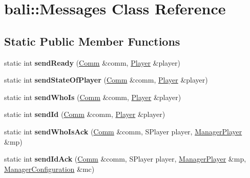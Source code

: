 \hypertarget{classbali_1_1_messages}{\section{bali\-:\-:Messages Class Reference}
\label{classbali_1_1_messages}
}
\subsection*{Static Public Member Functions}
\begin{DoxyCompactItemize}
\item 
\hypertarget{classbali_1_1_messages_aca0ea01768bce05de3d875fddcde5900}{static int {\bfseries send\-Ready} (\hyperlink{classbali_1_1_comm}{Comm} \&comm, \hyperlink{classbali_1_1_player}{Player} \&player)}\label{classbali_1_1_messages_aca0ea01768bce05de3d875fddcde5900}

\item 
\hypertarget{classbali_1_1_messages_aa33581609f3bdd2b99a90095cb76bcd0}{static int {\bfseries send\-State\-Of\-Player} (\hyperlink{classbali_1_1_comm}{Comm} \&comm, \hyperlink{classbali_1_1_player}{Player} \&player)}\label{classbali_1_1_messages_aa33581609f3bdd2b99a90095cb76bcd0}

\item 
\hypertarget{classbali_1_1_messages_a8b70f9b900ebfc4ca9dfb40ecb77ef95}{static int {\bfseries send\-Who\-Is} (\hyperlink{classbali_1_1_comm}{Comm} \&comm, \hyperlink{classbali_1_1_player}{Player} \&player)}\label{classbali_1_1_messages_a8b70f9b900ebfc4ca9dfb40ecb77ef95}

\item 
\hypertarget{classbali_1_1_messages_a14f34a5395f40836d07bbe83d7959c28}{static int {\bfseries send\-Id} (\hyperlink{classbali_1_1_comm}{Comm} \&comm, \hyperlink{classbali_1_1_player}{Player} \&player)}\label{classbali_1_1_messages_a14f34a5395f40836d07bbe83d7959c28}

\item 
\hypertarget{classbali_1_1_messages_a0df8ef8fb754433424f5c831ebc0d835}{static int {\bfseries send\-Who\-Is\-Ack} (\hyperlink{classbali_1_1_comm}{Comm} \&comm, S\-Player player, \hyperlink{classbali_1_1_manager_player}{Manager\-Player} \&mp)}\label{classbali_1_1_messages_a0df8ef8fb754433424f5c831ebc0d835}

\item 
\hypertarget{classbali_1_1_messages_ae2108618831b060f176372ba672bfe7c}{static int {\bfseries send\-Id\-Ack} (\hyperlink{classbali_1_1_comm}{Comm} \&comm, S\-Player player, \hyperlink{classbali_1_1_manager_player}{Manager\-Player} \&mp, \hyperlink{classbali_1_1_manager_configuration}{Manager\-Configuration} \&mc)}\label{classbali_1_1_messages_ae2108618831b060f176372ba672bfe7c}


\end{DoxyCompactItemize}
